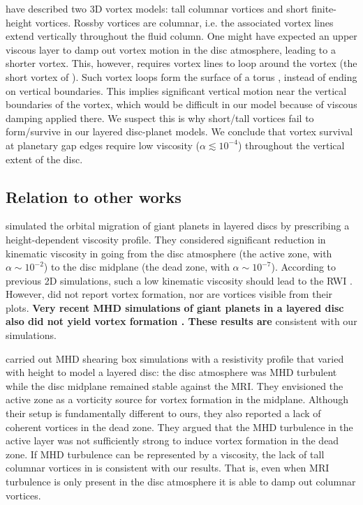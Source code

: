 \cite{barranco05} have described two 
3D vortex models: tall columnar vortices and short finite-height vortices. 
Rossby vortices are columnar, i.e. the associated vortex lines
extend vertically throughout the fluid column. One might have expected
an upper viscous layer to damp out vortex motion in the disc atmosphere, leading to a shorter
vortex. This, however, requires vortex lines to loop around the
vortex (the short vortex of \citeauthor{barranco05}). Such  
vortex loops form the surface of a torus \citep[see, for 
  example, Fig. 1 in][]{barranco05}, instead of ending on 
vertical boundaries. This implies significant vertical
motion near the vertical boundaries of the vortex, which would be  
difficult in our model because of viscous damping applied there. We
suspect this is why short/tall vortices fail to form/survive in our
layered disc-planet models. We conclude that vortex
survival at planetary gap edges require low viscosity
($\alpha\lesssim10^{-4}$) throughout the vertical extent of the
disc.     


\subsection{Relation to other works}
\cite{pierens10} simulated the orbital migration of giant planets in
layered discs by prescribing a height-dependent viscosity profile. They
considered significant reduction in kinematic viscosity in going from
the disc atmosphere (the active zone, with $\alpha\sim10^{-2}$) to the
disc midplane (the dead zone, with $\alpha\sim10^{-7}$). According to
previous 2D simulations, such a low kinematic viscosity should lead to
the RWI \citep{valborro06,valborro07}. However, \cite{pierens10}
did not report vortex formation, nor are vortices visible from their
plots. {\bf Very recent MHD simulations of giant planets in a layered
  disc also did not yield vortex formation \citep{gressel13}. 
These results are} consistent with our simulations. 

\cite{oishi09} carried out MHD shearing box simulations with 
a resistivity profile that varied with height to model a
layered disc: the disc atmosphere was MHD turbulent while the disc
midplane remained stable against the MRI. They envisioned the active
zone as a vorticity source for vortex formation in the midplane.  
Although their setup is fundamentally different to ours, they also
reported a lack of coherent vortices in the dead zone. They argued
that the MHD turbulence in the active layer was not sufficiently strong
to induce vortex formation in the dead zone. If MHD turbulence can be
represented by a viscosity, the lack of tall columnar vortices in
\cite{oishi09} is consistent with our results. That is,
even when MRI turbulence is only present in the disc atmosphere it is
able to damp out columnar vortices.     

